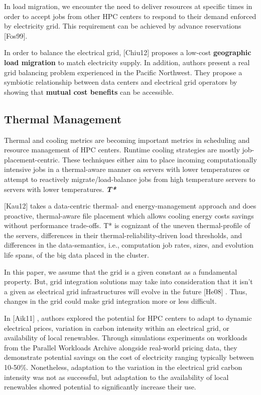 \documentclass{llncs}
\begin{document}
In load migration, we encounter the need to deliver
resources at specific times in order to accept jobs from other HPC centers
to respond to their demand enforced by electricity grid. This requirement
can be achieved by advance reservations 
\cite{foster_distributed_1999}
[Fos99]. 

In order to balance the electrical grid,
\cite{chiu_electric_2012}
[Chiu12] proposes a low-cost
\textbf{geographic load migration} to match electricity supply. In addition,
authors present a real grid balancing problem experienced in the Pacific
Northwest. They propose a symbiotic relationship between data centers and
electrical grid operators by showing that \textbf{mutual cost benefits }can
be accessible.

\subsection{Thermal Management}
Thermal and cooling metrics are becoming important metrics in scheduling and
resource management of HPC centers. Runtime cooling strategies are mostly
job-placement-centric. These techniques either aim to place incoming
computationally intensive jobs in a thermal-aware manner on servers with
lower temperatures or attempt to reactively migrate/load-balance jobs from
high temperature servers to servers with lower temperatures.
\textbf{\textit{T* }} 

\cite{kaushik_t*:_2012}
[Kau12]
 takes a data-centric thermal- and
energy-management approach and does proactive, thermal-aware file placement
which allows cooling energy costs savings without performance trade-offs. T*
is cognizant of the uneven thermal-profile of the servers, differences in
their thermal-reliability-driven load thresholds, and differences in the
data-semantics, i.e., computation job rates, sizes, and evolution life
spans, of the big data placed in the cluster.

In this paper, we assume that the grid is a given constant as a fundamental
property. But, grid integration solutions may take into consideration that
it isn't a given as electrical grid infrastructures will evolve in the
future 
\cite{he_architecture_2008}
[He08]
. Thus, changes in the grid could make grid integration more or
less difficult.

In 
\cite{aikema_electrical_2011}
[Aik11] , authors explored the potential for HPC centers to adapt to
dynamic electrical prices, variation in carbon intensity within an
electrical grid, or availability of local renewables. Through simulations
experiments on workloads from the Parallel Workloads Archive alongside
real-world pricing data, they demonstrate potential savings on the cost of
electricity ranging typically between 10-50{\%}. Nonetheless, adaptation to
the variation in the electrical grid carbon intensity was not as successful,
but adaptation to the availability of local renewables showed potential to
significantly increase their use.
\end{document}
